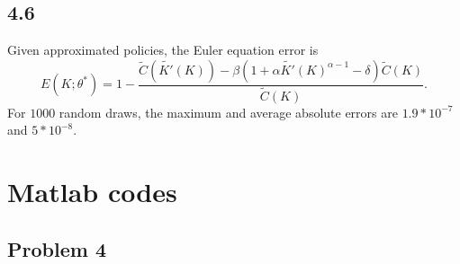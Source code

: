 \documentclass[11pt]{article}
\newcommand{\alp}{\ensuremath{\alpha}}
\newcommand{\bet}{\ensuremath{\beta}}
\newcommand{\tht}{\ensuremath{\theta}}
\begin{document}
\subsection*{4.6}
Given approximated policies, the Euler equation error is $$E(K; \tht^*) = 1 - \frac{\tilde{C}(\tilde{K'}(K)) - \bet ( 1 + \alp \tilde{K'}(K)^{\alp-1} - \delta) \tilde{C}(K)}{ \tilde{C}(K)}.$$ For $1000$ random draws, the maximum and average absolute errors are $1.9*10^{-7}$ and $5*10^{-8}$.

%
%

\appendix

\section*{Matlab codes}

\subsection*{Problem 4}
\end{document}

